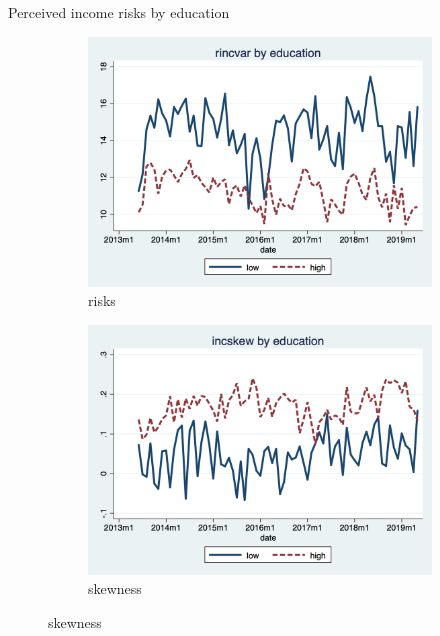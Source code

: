 \documentclass{beamer}
\begin{document}


\begin{frame}{Perceived income risks by education}
	\begin{figure}[ht]
		\label{ts_incvar_educ_g_mean}
		\begin{subfigure}[b]{0.46\textwidth}
			\centering
			\caption{risks}
			\includegraphics[width=\textwidth, height = 0.33\textheight]{figures/ts_rincvar_edu_g_mean.png}
		\end{subfigure}
		\begin{subfigure}[b]{0.46\textwidth}
			\caption{skewness}
			\includegraphics[width=\textwidth, height = 0.33\textheight]{figures/ts_incskew_edu_g_mean.png}

\end{subfigure}
\end{figure}
\end{frame}
\end{document}
